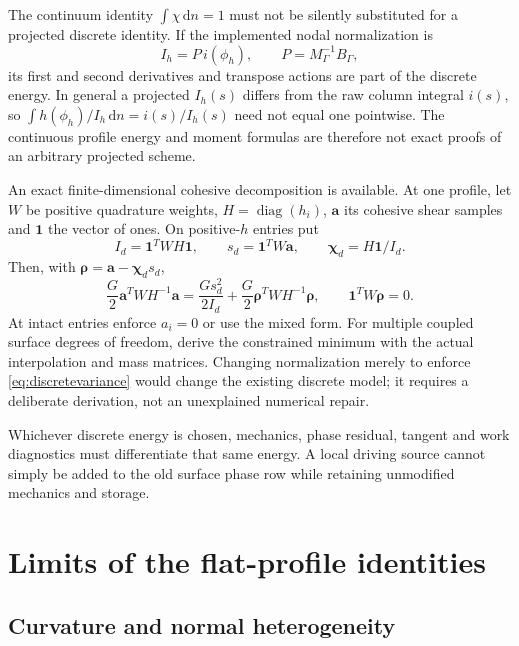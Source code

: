 \documentclass[11pt,a4paper]{article}
\numberwithin{equation}{section}
\newcommand{\dd}{\,\mathrm d}
\begin{document}
The continuum identity $\int\chi\dd n=1$ must not be silently substituted
for a projected discrete identity. If the implemented nodal normalization is
\begin{equation}
 I_h=P\,i(\phi_h),\qquad P=M_\Gamma^{-1}B_\Gamma,
\end{equation}
its first and second derivatives and transpose actions are part of the
discrete energy. In general a projected $I_h(s)$ differs from the raw
column integral $i(s)$, so
$\int h(\phi_h)/I_h\dd n=i(s)/I_h(s)$ need not equal one pointwise.
The continuous profile energy and moment formulas are therefore not exact
proofs of an arbitrary projected scheme.

An exact finite-dimensional cohesive decomposition is available.
At one profile, let $W$ be positive quadrature weights, $H=\operatorname{diag}(h_i)$,
$\bm a$ its cohesive shear samples and $\bm1$ the vector of ones.
On positive-$h$ entries put
\begin{equation}
 I_d=\bm1^TWH\bm1,\qquad
 s_d=\bm1^TW\bm a,\qquad
 \bm\chi_d=H\bm1/I_d.
\end{equation}
Then, with $\bm\rho=\bm a-\bm\chi_d s_d$,
\begin{equation}
 \frac G2\bm a^TWH^{-1}\bm a
 =\frac{G s_d^2}{2I_d}
    +\frac G2\bm\rho^TWH^{-1}\bm\rho,\qquad
 \bm1^TW\bm\rho=0.
 \label{eq:discretevariance}
\end{equation}
At intact entries enforce $a_i=0$ or use the mixed form.
For multiple coupled surface degrees of freedom, derive the constrained
minimum with the actual interpolation and mass matrices.
Changing normalization merely to enforce \eqref{eq:discretevariance} would
change the existing discrete model; it requires a deliberate derivation,
not an unexplained numerical repair.

Whichever discrete energy is chosen, mechanics, phase residual, tangent and
work diagnostics must differentiate that same energy. A local driving
source cannot simply be added to the old surface phase row while retaining
unmodified mechanics and storage.

\section{Limits of the flat-profile identities}

\subsection{Curvature and normal heterogeneity}
\end{document}
